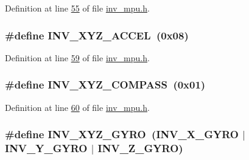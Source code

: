 Definition at line \hyperlink{inv__mpu_8h_source_l00055}{55} of file \hyperlink{inv__mpu_8h_source}{inv\+\_\+mpu.\+h}.

\subsubsection[{\texorpdfstring{I\+N\+V\+\_\+\+X\+Y\+Z\+\_\+\+A\+C\+C\+EL}{INV_XYZ_ACCEL}}]{\setlength{\rightskip}{0pt plus 5cm}\#define I\+N\+V\+\_\+\+X\+Y\+Z\+\_\+\+A\+C\+C\+EL~(0x08)}\hypertarget{group___d_r_i_v_e_r_s_gaa03f025a17ed491e70b88274e89c75c5}{}\label{group___d_r_i_v_e_r_s_gaa03f025a17ed491e70b88274e89c75c5}


Definition at line \hyperlink{inv__mpu_8h_source_l00059}{59} of file \hyperlink{inv__mpu_8h_source}{inv\+\_\+mpu.\+h}.

\subsubsection[{\texorpdfstring{I\+N\+V\+\_\+\+X\+Y\+Z\+\_\+\+C\+O\+M\+P\+A\+SS}{INV_XYZ_COMPASS}}]{\setlength{\rightskip}{0pt plus 5cm}\#define I\+N\+V\+\_\+\+X\+Y\+Z\+\_\+\+C\+O\+M\+P\+A\+SS~(0x01)}\hypertarget{group___d_r_i_v_e_r_s_ga7fc9c1dbdcb2ac8cc2a4128a5799482a}{}\label{group___d_r_i_v_e_r_s_ga7fc9c1dbdcb2ac8cc2a4128a5799482a}


Definition at line \hyperlink{inv__mpu_8h_source_l00060}{60} of file \hyperlink{inv__mpu_8h_source}{inv\+\_\+mpu.\+h}.

\subsubsection[{\texorpdfstring{I\+N\+V\+\_\+\+X\+Y\+Z\+\_\+\+G\+Y\+RO}{INV_XYZ_GYRO}}]{\setlength{\rightskip}{0pt plus 5cm}\#define I\+N\+V\+\_\+\+X\+Y\+Z\+\_\+\+G\+Y\+RO~({\bf I\+N\+V\+\_\+\+X\+\_\+\+G\+Y\+RO} $\vert$ {\bf I\+N\+V\+\_\+\+Y\+\_\+\+G\+Y\+RO} $\vert$ {\bf I\+N\+V\+\_\+\+Z\+\_\+\+G\+Y\+RO})}\hypertarget{group___d_r_i_v_e_r_s_ga3fdc30f9c0a26c2c4e2bb88921f91629}{}\label{group___d_r_i_v_e_r_s_ga3fdc30f9c0a26c2c4e2bb88921f91629}


